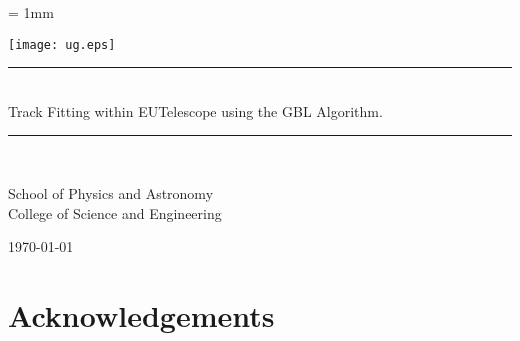 \documentclass[12pt,a4paper]{report}
\newif\
\newcommand{\twolinesahead}[5][]{
  \def\dist{6};
  \newdimen\ym;
  \newdimen\xm;
  \newdimen\yf;
  \newdimen\xf;
  \ExtractCoordinate{$(#3)$}{\xm}{\ym};
  \ExtractCoordinate{$(#2)$}{\xf}{\yf};
  \ifdim \ym < \yf
  \def\fac{1};
  \else
  \def\fac{-1};
  \fi
  \path [pline] ([yshift=-\dist * \fac]#2.east) -- (#3.west);
  \coordinate (m) at ($(#2)!0.5!(#3)$);
  \coordinate (mp) at ($(m)+(0,1em*\fac)$);
  \node (nm) at (mp) {#5};
  \foreach \x in {\fac,0}
  {
    \ifnum \x = 0
    \path [pline, decoration={markings, mark=at position 0.5 with {\arrow{triangle 60}}}, postaction={decorate}] ([yshift=\dist * \x]#2.east) -- ([yshift=\dist * \x]#4.west);
    \else
    \path [pline] ([yshift=\dist * \x]#2.east) -- ([yshift=\dist * \x]#4.west);
    \fi
  };
}
\newcommand{\HRule}{\rule{\linewidth}{0.5mm}}
\begin{document}
\unitlength = 1mm

\onehalfspace

\begin{titlepage}
\begin{center}
\texttt{[image: ug.eps]}\\[1.0cm]



\HRule\\[0.6cm]
{ \Huge Track Fitting within EUTelescope using the GBL Algorithm. }\\[0.6cm]
\HRule\\[0.7cm]

{
\Large


School of Physics and Astronomy\\
College of Science and Engineering\\[1.5cm]

}

\vfill

{\large \mydate\today}

\end{center}
\end{titlepage}



\chapter*{Acknowledgements}

\clearpage

\begin{abstract}

\end{abstract}
\clearpage

\tableofcontents
\clearpage




%

%
\end{document}
